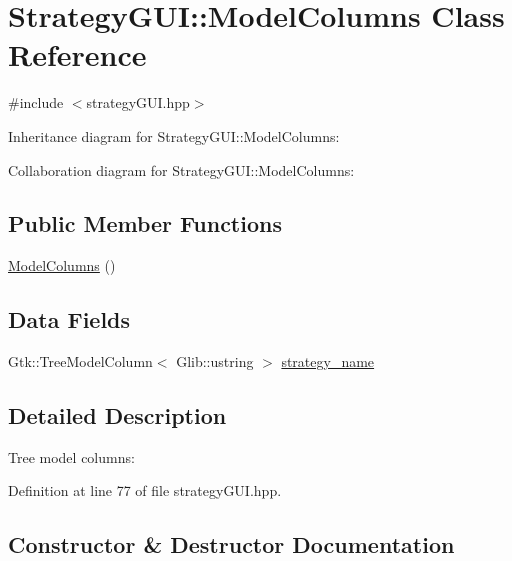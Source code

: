 \hypertarget{class_strategy_g_u_i_1_1_model_columns}{}\section{Strategy\+G\+UI\+:\+:Model\+Columns Class Reference}
\label{class_strategy_g_u_i_1_1_model_columns}


{\ttfamily \#include $<$strategy\+G\+U\+I.\+hpp$>$}



Inheritance diagram for Strategy\+G\+UI\+:\+:Model\+Columns\+:


Collaboration diagram for Strategy\+G\+UI\+:\+:Model\+Columns\+:
\subsection*{Public Member Functions}
\begin{DoxyCompactItemize}
\item 
\hyperlink{class_strategy_g_u_i_1_1_model_columns_a6c10182f53f7e0b25ae3a0aa9be87048}{Model\+Columns} ()
\end{DoxyCompactItemize}
\subsection*{Data Fields}
\begin{DoxyCompactItemize}
\item 
Gtk\+::\+Tree\+Model\+Column$<$ Glib\+::ustring $>$ \hyperlink{class_strategy_g_u_i_1_1_model_columns_a4338572b76dd7ebb1bd59b7ac2aca591}{strategy\+\_\+name}
\end{DoxyCompactItemize}


\subsection{Detailed Description}
Tree model columns\+: 

Definition at line 77 of file strategy\+G\+U\+I.\+hpp.



\subsection{Constructor \& Destructor Documentation}
\mbox{\label{class_strategy_g_u_i_1_1_model_columns_a6c10182f53f7e0b25ae3a0aa9be87048}} 
